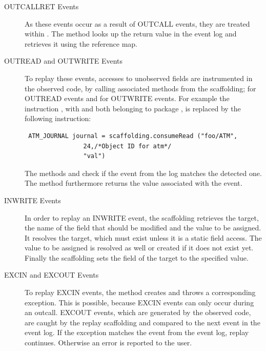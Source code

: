 \begin{description}
 \item [OUTCALLRET Events]As these events occur as a result of OUTCALL events, they are treated within . The method looks up the return value in the event log and retrieves it using the reference map. 
 \item [OUTREAD and OUTWRITE Events] To replay these events, accesses to unobserved fields are instrumented in the observed code, by calling associated methods from the scaffolding;  for OUTREAD events and  for OUTWRITE events. For example the instruction , with  and  both belonging to package , is replaced by the following instruction:
\begin{lstlisting}
 ATM_JOURNAL journal = scaffolding.consumeRead ("foo/ATM",
                24,/*Object ID for atm*/
                "val")
\end{lstlisting}
The methods  and  check if the event from the log matches the detected one. The method  furthermore returns the value associated with the event.
 \item [INWRITE Events] In order to replay an INWRITE event, the scaffolding retrieves the target, the name of the field that should be modified and the value to be assigned. It resolves the target, which must exist unless it is a static field access. The value to be assigned is resolved as well or created if it does not exist yet. Finally the scaffolding sets the field of the target to the specified value.
 \item [EXCIN and EXCOUT Events]  To replay EXCIN events, the method  creates and throws a corresponding exception. This is possible, because EXCIN events can only occur during an outcall. EXCOUT events, which are generated by the observed code, are caught by the replay scaffolding and compared to the next event in the event log. If the exception matches the event from the event log, replay continues. Otherwise an error is reported to the user.
\end{description}


